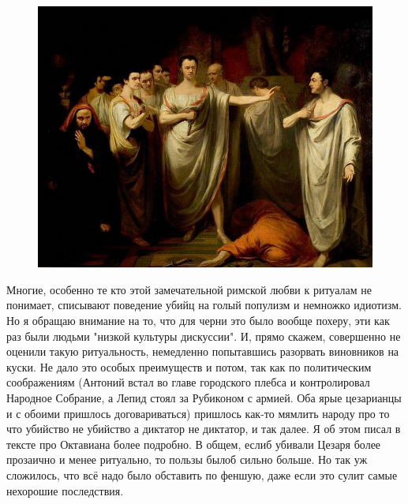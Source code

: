 \begin{figure}[h!tb] 
	\centering\includegraphics[scale=0.5]{ReligionRomeCaesar/159574567419687932.png}
\end{figure}

Многие, особенно те кто этой замечательной римской любви к ритуалам не понимает, списывают поведение убийц на голый популизм и немножко идиотизм. Но я обращаю внимание на то, что для черни это было вообще похеру, эти как раз были людьми "низкой культуры дискуссии". И, прямо скажем, совершенно не оценили такую ритуальность, немедленно попытавшись разорвать виновников на куски. Не дало это особых преимуществ и потом, так как по политическим соображениям (Антоний встал во главе городского плебса и контролировал Народное Собрание, а Лепид стоял за Рубиконом с армией. Оба ярые цезарианцы и с обоими пришлось договариваться) пришлось как-то мямлить народу про то что убийство не убийство а диктатор не диктатор, и так далее. Я об этом писал в тексте про Октавиана более подробно. В общем, еслиб убивали Цезаря более прозаично и менее ритуально, то пользы былоб сильно больше. Но так уж сложилось, что всё надо было обставить по феншую, даже если это сулит самые нехорошие последствия. 


